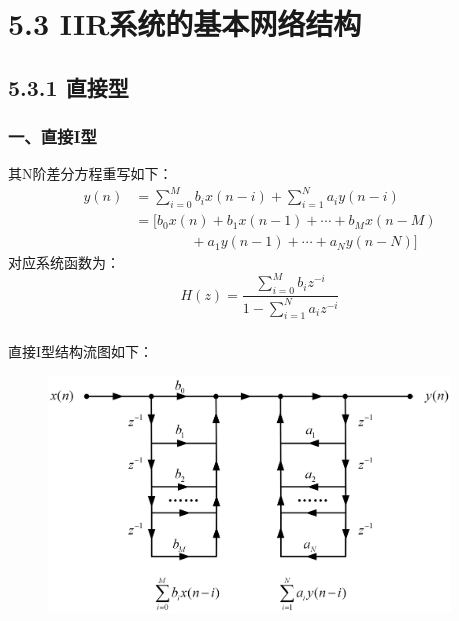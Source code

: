 \documentclass[notheorems,compress,mathserif,table]{beamer}
\begin{document}

\section{5.3 IIR系统的基本网络结构}

\subsection{5.3.1 直接型}
\begin{frame}[shrink]\frametitle{一、直接I型}%
其N阶差分方程重写如下：
\begin{equation}
\begin{split}
y(n) &= \sum_{i=0}^{M}b_ix(n-i) + \sum_{i=1}^{N}a_iy(n-i)\\
     &= [b_0x(n)+b_1x(n-1)+\cdots+b_Mx(n-M) \\
     &\quad\quad\quad\quad +a_1y(n-1)+\cdots+a_Ny(n-N)]
\end{split}
\end{equation}
对应系统函数为：
$$H(z)=\frac{\sum_{i=0}^{M}b_i z^{-i}}{1-\sum_{i=1}^{N}a_i z^{-i}}$$
\end{frame}
\begin{frame}\frametitle{}%

直接I型结构流图如下：
\begin{figure}[h]
\centering
\includegraphics[width=0.95\textwidth]{zhijieyixing.jpg}
\end{figure}
\end{frame}
\end{document}
